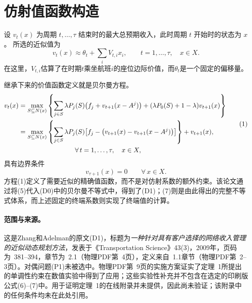 \documentclass{article}
\begin{document}
\section*{仿射值函数构造}

设 $v_t(x)$ 为周期 $t,\ldots,\tau$ 结束时的最大总预期收入，此时周期 $t$ 开始时的状态为 $x$。 所选的近似值为
\begin{equation}
v_t(x)\approx\theta_t+\sum_i V_{t,i}x_i,
\qquad t=1,\ldots,\tau,\quad x\in X.
\tag{5}
\end{equation}
在这里，$V_{t,i}$估算了在时期$t$乘坐航班$i$的座位边际价值，而$\theta_t$是一个固定的偏移量。

继承下来的价值函数定义就是贝尔曼方程。
\begin{equation}
\begin{aligned}
v_t(x)
&=\max_{S\subseteq N(x)}\left\{
\sum_{j\in S}\lambda P_j(S)\bigl(f_j+v_{t+1}(x-A^j)\bigr)
 +(\lambda P_0(S)+1-\lambda)v_{t+1}(x)
\right\}\\
&=\max_{S\subseteq N(x)}\left\{
\sum_{j\in S}\lambda P_j(S)
\bigl[f_j-\bigl(v_{t+1}(x)-v_{t+1}(x-A^j)\bigr)\bigr]
\right\}+v_{t+1}(x),\\
&\hspace{30mm}\forall\,t=1,\ldots,\tau,\quad x\in X,
\end{aligned}
\tag{1}
\end{equation}
具有边界条件
\[
v_{\tau+1}(x)=0\qquad\forall\,x\in X.
\]
方程(1)定义了需要近似的精确值函数，而不是对仿射系数的额外约束。该论文通过将(5)代入(D0)中的贝尔曼不等式中，得到了(D1)；(7)则是由此得出的完整不等式体系，而上述固定的终端系数则实现了终端值的计算。

\paragraph{范围与来源。}
这是Zhang和Adelman的原文(D1)，标题为\emph{一种针对具有客户选择的网络收入管理的近似动态规划方法}，发表于《Transportation Science》43(3)，2009年，页码为~381--394，章节为~2.1（物理PDF第~4页），定义来自~1.1章节（物理PDF第~2--3页）。对偶问题(P1)未被选中。物理PDF第~9页的实施方案证实了定理~1所提出的单调性约束在数值实验中得到了应用；这些实验性补充并不包含在选定的印刷版公式(6)--(7)中。用于证明定理~1的在线附录并未提供，因此尚未验证；该附录中的任何条件均未在此处引用。
\end{document}
